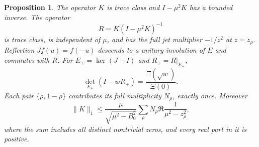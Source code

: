 \documentclass[11pt,a4paper]{article}
\newtheorem*{proposition}{Proposition}
\begin{document}
\begin{proposition}
The operator $K$ is trace class and $I-\mu^2K$ has a bounded inverse. The operator
\[
 R=K(I-\mu^2K)^{-1}
\]
is trace class, is independent of $\mu$, and has the full jet multiplier $-1/z^2$ at $z=z_\rho$. Reflection $Jf(u)=f(-u)$ descends to a unitary involution of $E$ and commutes with $R$. For $E_+=\ker(J-I)$ and $R_+=R|_{E_+}$,
\begin{equation}\label{eq:masactualXi}
 \det_{E_+}(I-wR_+)=\frac{\Xi(\sqrt w)}{\Xi(0)}.
\end{equation}
Each pair $\{\rho,1-\rho\}$ contributes its full multiplicity $N_\rho$, exactly once. Moreover
\begin{equation}\label{eq:masGreennorm}
 \|K\|_1\le\frac{\mu}{\sqrt{\mu^2-B_0^2}}
 \sum_\rho N_\rho\Re\frac1{\mu^2-z_\rho^2},
\end{equation}
where the sum includes all distinct nontrivial zeros, and every real part in it is positive.
\end{proposition}
\end{document}

